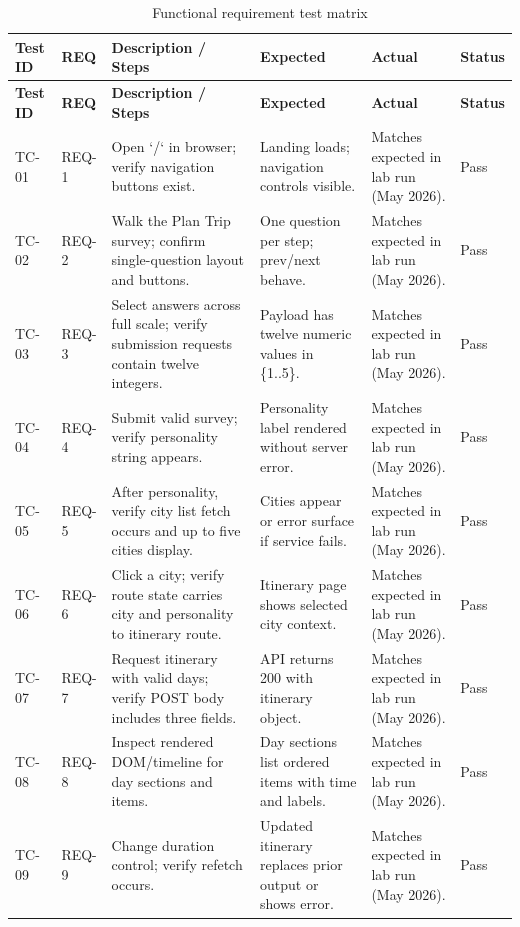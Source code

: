 \documentclass[12pt,oneside,openany]{report}
\begin{document}
\begin{longtable}{|p{}|p{}|p{}|p{}|p{}|p{}|}
\caption{Functional requirement test matrix\label{tab:tests}}\\
\hline
\textbf{Test ID} & \textbf{REQ} & \textbf{Description / Steps} & \textbf{Expected} & \textbf{Actual} & \textbf{Status} \\
\hline
\endfirsthead
\hline
\textbf{Test ID} & \textbf{REQ} & \textbf{Description / Steps} & \textbf{Expected} & \textbf{Actual} & \textbf{Status} \\
\hline
\endhead
\hline
\endfoot

TC-01 & REQ-1 & Open `/` in browser; verify navigation buttons exist. & Landing loads; navigation controls visible. & Matches expected in lab run (May 2026). & Pass \\
\hline
TC-02 & REQ-2 & Walk the Plan Trip survey; confirm single-question layout and buttons. & One question per step; prev/next behave. & Matches expected in lab run (May 2026). & Pass \\
\hline
TC-03 & REQ-3 & Select answers across full scale; verify submission requests contain twelve integers. & Payload has twelve numeric values in \{1..5\}. & Matches expected in lab run (May 2026). & Pass \\
\hline
TC-04 & REQ-4 & Submit valid survey; verify personality string appears. & Personality label rendered without server error. & Matches expected in lab run (May 2026). & Pass \\
\hline
TC-05 & REQ-5 & After personality, verify city list fetch occurs and up to five cities display. & Cities appear or error surface if service fails. & Matches expected in lab run (May 2026). & Pass \\
\hline
TC-06 & REQ-6 & Click a city; verify route state carries city and personality to itinerary route. & Itinerary page shows selected city context. & Matches expected in lab run (May 2026). & Pass \\
\hline
TC-07 & REQ-7 & Request itinerary with valid days; verify POST body includes three fields. & API returns 200 with itinerary object. & Matches expected in lab run (May 2026). & Pass \\
\hline
TC-08 & REQ-8 & Inspect rendered DOM/timeline for day sections and items. & Day sections list ordered items with time and labels. & Matches expected in lab run (May 2026). & Pass \\
\hline
TC-09 & REQ-9 & Change duration control; verify refetch occurs. & Updated itinerary replaces prior output or shows error. & Matches expected in lab run (May 2026). & Pass \\

\end{longtable}
\end{document}
